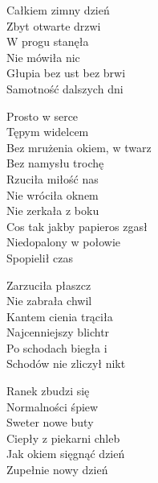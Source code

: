 \begin{text}
Całkiem zimny dzień\\
Zbyt otwarte drzwi\\
W progu stanęła\\
Nie mówiła nic\\
Głupia bez ust bez brwi\\
Samotność dalszych dni

\vin Prosto w serce\\
\vin Tępym widelcem\\
\vin Bez mrużenia okiem, w twarz\\
\vin Bez namysłu trochę\\
\vin Rzuciła miłość nas\\
\vin Nie wróciła oknem\\
\vin Nie zerkała z boku\\
\vin Cos tak jakby papieros zgasł\\
\vin Niedopalony w połowie\\
\vin Spopielił czas

Zarzuciła płaszcz\\
Nie zabrała chwil\\
Kantem cienia trąciła\\
Najcenniejszy blichtr\\
Po schodach biegła i\\
Schodów nie zliczył nikt

Ranek zbudzi się\\
Normalności śpiew\\
Sweter nowe buty\\
Ciepły z piekarni chleb\\
Jak okiem sięgnąć dzień\\
Zupełnie nowy dzień
\end{text}
\begin{chord}
\end{chord}